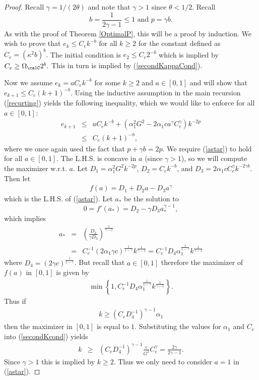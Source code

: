 \begin{proof}
Recall $\gamma=1/(2\theta)$ and note that $\gamma> 1$ since $\theta< 1/2$. Recall 
$$
b=\frac{1}{2\gamma-1}\leq 1\text{ and } p=\gamma b.
$$
As with the proof of Theorem \ref{OptimalP}, this will be a proof by induction. We wish to prove that $e_k\leq C_e k^{-b}$ for all $k\geq 2$ for the constant defined as 
$
C_e = \left(\kappa^2 b\right)^b.
$
 The initial condition is 
$
e_{2}\leq C_e 2^{-b}
$
which is implied by
$
C_e\geq\Omega_\calC 2^b\label{C_initCond2}.
$
This in turn is implied by (\ref{secondKappaCond}).

Now we assume $e_k=aC_e k^{-b}$ for some $k\geq 2$ and $a\in[0,1]$ and will show that $e_{k+1}\leq C_e(k+1)^{-b}$. Using  the inductive assumption in the main recursion (\ref{recurting}) yields the following inequality, which we would like to enforce for all $a\in[0,1]$:
\begin{eqnarray}\label{astar}
e_{k+1}&\leq& a C_e k^{-b}
+
\left(
\alpha_1^2 G^2
-
2 \alpha_1 c a^\gamma C_e^\gamma
\right)
k^{-2p}
\nonumber\\
&\leq&
C_e (k+1)^{-b},
\end{eqnarray}
where we once again used the fact that $p+\gamma b=2 p$. 
We require (\ref{astar}) to hold for all $a\in[0,1]$. The L.H.S. is concave in $a$ (since $\gamma> 1$), so we will compute the maximizer w.r.t. $a$. Let $D_1 = \alpha_1^2 G^2 k^{-2p}$, $D_2 = C_e k^{-b}$, and $D_3= 2\alpha_1 c C_e^\gamma k ^{-2\gamma b}$. Then let
\begin{eqnarray*}
f(a)=D_1 + D_2 a-D_3 a^\gamma
\end{eqnarray*}
which is the L.H.S. of (\ref{astar}).
Let $a_*$ be the solution to 
$$
0 = f'(a_*) = D_2 - \gamma D_3 a_*^{\gamma - 1},
$$ 
which implies
\begin{eqnarray*}
a_* &=& \left(\frac{D_2}{\gamma D_3}\right)^{\frac{1}{\gamma-1}}
\\
&=&
C_e^{-1}
(2\alpha_1\gamma c)
^{\frac{1}{1-\gamma}}
k^{\frac{1}{\gamma-1}}
= 
C_e^{-1}D_4
\alpha_1^{\frac{1}{1-\gamma}}
k^{\frac{1}{\gamma-1}}
\end{eqnarray*}
where $D_4 = (2\gamma c)^{\frac{1}{1-\gamma}}$. But recall that $a\in[0,1]$ therefore the maximizer of $f(a)$ in $[0,1]$ is given by
\begin{eqnarray*}
\min\left\{1,C_e^{-1}D_4
\alpha_1^{\frac{1}{1-\gamma}}
k^{\frac{1}{\gamma-1}}\right\}.
\end{eqnarray*}
Thus if 
\begin{eqnarray}\label{secondKcond}
k\geq (C_e D_4^{-1})^{\gamma-1}\alpha_1
\end{eqnarray}
then the maximizer in $[0,1]$ is equal to $1$. Substituting the values for $\alpha_1$ and $C_e$ into (\ref{secondKcond}) yields
\begin{eqnarray*}
k&\geq& (C_e D_4^{-1})^{\gamma-1}\frac{c}{G^2}C_e^\gamma
=
\frac{2\gamma}{2\gamma-1}.
\end{eqnarray*}
Since $\gamma> 1$ this is implied by $k\geq 2$. Thus we only need to consider $a=1$ in (\ref{astar}).


\end{proof}
